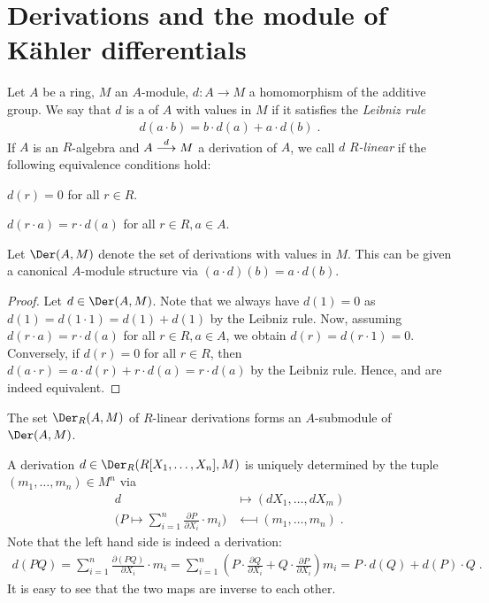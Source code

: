 \documentclass[a4paper,parskip=half,numbers=enddot, DIV=12]{scrreprt}
\begin{document}
\section{Derivations and the module of Kähler differentials}
\begin{defi}[Derivations]
    Let $A$ be a ring, $M$ an $A$-module, $d\colon A\to M$  a homomorphism of the additive group. We say that $d$ is a  of $A$ with values in $M$ if it satisfies the \emph{Leibniz rule} 
    \begin{align*}
    	 d(a\cdot b) = b\cdot d(a) + a\cdot d(b)\;.
    \end{align*}
     If $A$ is an $R$-algebra and $A\morphism[d] M$ a derivation of $A$, we call $d$ \emph{$R$-linear} if the following equivalence conditions hold:
    \begin{alphanumerate}
        \item 
            $d(r) = 0$ for all $r\in R$.
        \item
            $d(r\cdot a) = r\cdot d(a)$ for all $r\in R, a\in A$.
    \end{alphanumerate}
    Let $\Der(A,M)$ denote the set of derivations with values in $M$. This can be given a canonical $A$-module structure via $(a\cdot d)(b) = a\cdot d(b)$.
\end{defi}
\begin{proof}
    Let $d\in \Der(A,M)$. Note that we always have $d(1)=0$ as $d(1)=d(1\cdot1)=d(1)+d(1)$ by the Leibniz rule. Now, assuming $d(r\cdot a)=r\cdot d(a)$ for all $r\in R, a\in A$, we obtain $d(r)=d(r\cdot1)=0$. Conversely, if $d(r)=0$ for all $r\in R$, then $d(a\cdot r) = a\cdot d(r) + r\cdot d(a) = r\cdot d(a)$ by the Leibniz rule. Hence,  and  are indeed equivalent.
\end{proof}
\begin{rem}
    The set $\Der_R(A,M)$ of $R$-linear derivations forms an $A$-submodule of $\Der(A,M)$.
\end{rem}
\begin{example}
    A derivation $d\in\Der_R(R[X_1,\ldots,X_n], M)$ is uniquely determined by the tuple $(m_1,\ldots,m_n)\in M^n$ via
    \begin{align*}
        d&\longmapsto (dX_1,\ldots,dX_m)\\
        \bigg(P\mapsto \sum_{i=1}^n\frac{\partial P}{\partial X_i}\cdot m_i \bigg) &\longmapsfrom (m_1,\ldots,m_n)\;.
    \end{align*}
    Note that the left hand side is indeed a derivation:
    \begin{align*}
        d(PQ) = \sum_{i=1}^n \frac{\partial(PQ)}{\partial X_i} \cdot m_i = \sum_{i=1}^n \left( P \cdot\frac{\partial Q}{\partial X_i} + Q\cdot\frac{\partial P}{\partial X_i} \right) m_i = P\cdot d(Q) + d(P)\cdot Q\;.
    \end{align*}
    It is easy to see that the two maps are inverse to each other.
\end{example}
\end{document}
